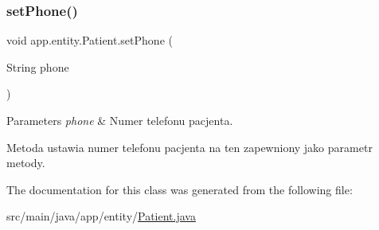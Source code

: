 \subsubsection{\texorpdfstring{setPhone()}{setPhone()}}
{\footnotesize\ttfamily void app.\+entity.\+Patient.\+set\+Phone (\begin{DoxyParamCaption}\item[{String}]{phone }\end{DoxyParamCaption})}


\begin{DoxyParams}{Parameters}
{\em phone} & Numer telefonu pacjenta.\\
\hline
\end{DoxyParams}
Metoda ustawia numer telefonu pacjenta na ten zapewniony jako parametr metody. 

The documentation for this class was generated from the following file\+:\begin{DoxyCompactItemize}
\item 
src/main/java/app/entity/\mbox{\hyperlink{_patient_8java}{Patient.\+java}}\end{DoxyCompactItemize}
